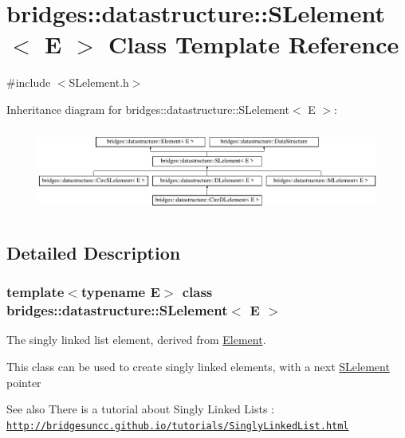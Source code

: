 \hypertarget{classbridges_1_1datastructure_1_1_s_lelement}{}\section{bridges\+:\+:datastructure\+:\+:S\+Lelement$<$ E $>$ Class Template Reference}
\label{classbridges_1_1datastructure_1_1_s_lelement}


{\ttfamily \#include $<$S\+Lelement.\+h$>$}

Inheritance diagram for bridges\+:\+:datastructure\+:\+:S\+Lelement$<$ E $>$\+:\begin{figure}[H]
\begin{center}
\leavevmode
\includegraphics[height=2.839037cm]{classbridges_1_1datastructure_1_1_s_lelement}
\end{center}
\end{figure}


\subsection{Detailed Description}
\subsubsection*{template$<$typename E$>$\newline
class bridges\+::datastructure\+::\+S\+Lelement$<$ E $>$}

The singly linked list element, derived from \mbox{\hyperlink{classbridges_1_1datastructure_1_1_element}{Element}}. 

This class can be used to create singly linked elements, with a next \mbox{\hyperlink{classbridges_1_1datastructure_1_1_s_lelement}{S\+Lelement}} pointer

\begin{DoxySeeAlso}{See also}
There is a tutorial about Singly Linked Lists \+: \href{http://bridgesuncc.github.io/tutorials/SinglyLinkedList.html}{\tt http\+://bridgesuncc.\+github.\+io/tutorials/\+Singly\+Linked\+List.\+html}
\end{DoxySeeAlso}

